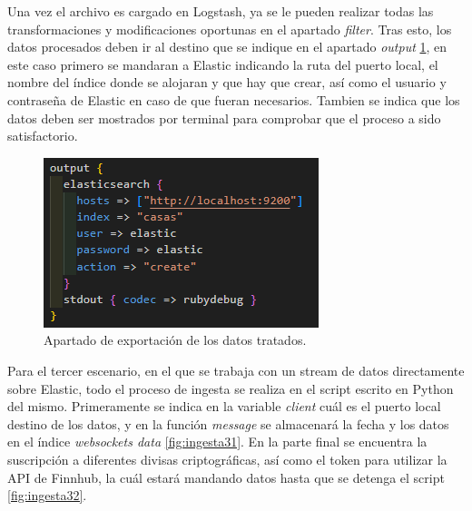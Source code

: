 Una vez el archivo es cargado en Logstash, ya se le pueden realizar todas las transformaciones y modificaciones oportunas en el apartado \textit{filter}. Tras esto, los datos procesados deben ir al destino que se indique en el apartado \textit{output} \ref{fig:ingesta22}, en este caso primero se mandaran a Elastic indicando la ruta del puerto local, el nombre del índice donde se alojaran y que hay que crear, así como el usuario y contraseña de Elastic en caso de que fueran necesarios. Tambien se indica que los datos deben ser mostrados por terminal para comprobar que el proceso a sido satisfactorio.

\begin{figure}
    \centering
    \includegraphics[width=1\linewidth]{img/ingesta2-2.png}
    \caption{Apartado de exportación de los datos tratados.}
    \label{fig:ingesta22}
\end{figure}

Para el tercer escenario, en el que se trabaja con un stream de datos directamente sobre Elastic, todo el proceso de ingesta se realiza en el script escrito en Python del mismo. Primeramente se indica en la variable \textit{client} cuál es el puerto local destino de los datos, y en la función \textit{message} se almacenará la fecha y los datos en el índice \textit{websockets data} \ref{fig:ingesta31}. En la parte final se encuentra la suscripción a diferentes divisas criptográficas, así como el token para utilizar la API de Finnhub, la cuál estará mandando datos hasta que se detenga el script \ref{fig:ingesta32}.

